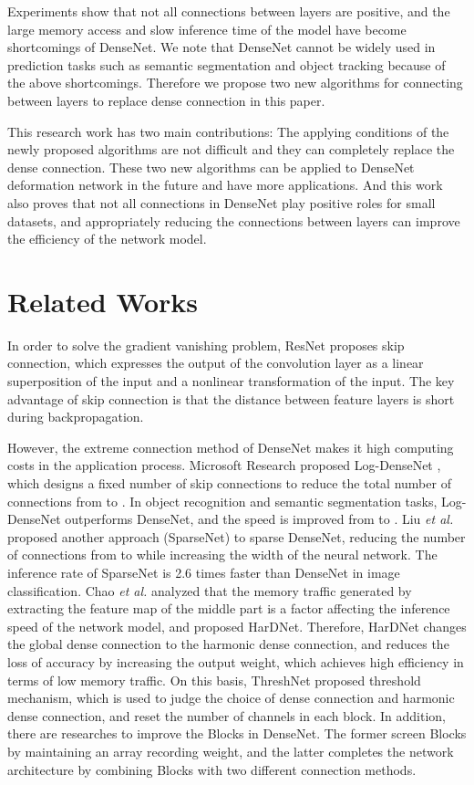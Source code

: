 \documentclass[conference]{IEEEtran}
\begin{document}
Experiments \cite{zhu2018sparsely} show that not all connections between layers are positive, and the large memory access and slow inference time of the model have become shortcomings of DenseNet. We note that DenseNet cannot be widely used in prediction tasks such as semantic segmentation and object tracking because of the above shortcomings. Therefore we propose two new algorithms for connecting between layers to replace dense connection in this paper.

This research work has two main contributions: The applying conditions of the newly proposed algorithms are not difficult and they can completely replace the dense connection. These two new algorithms can be applied to DenseNet deformation network in the future and have more applications. And this work also proves that not all connections in DenseNet play positive roles for small datasets, and appropriately reducing the connections between layers can improve the efficiency of the network model.

\section{Related Works}
In order to solve the gradient vanishing problem, ResNet proposes skip connection, which expresses the output of the convolution layer as a linear superposition of the input and a nonlinear transformation of the input. The key advantage of skip connection is that the distance between feature layers is short during backpropagation. 

However, the extreme connection method of DenseNet makes it high computing costs in the application process. Microsoft Research proposed Log-DenseNet \cite{hu2017log}, which designs a fixed number of skip connections to reduce the total number of connections from  to . In object recognition and semantic segmentation tasks, Log-DenseNet outperforms DenseNet, and the speed is improved from  to . Liu \emph{et al.} \cite{liu2018sparsenet} proposed another approach (SparseNet) to sparse DenseNet, reducing the number of connections from  to  while increasing the width of the neural network. The inference rate of SparseNet is 2.6 times faster than DenseNet in image classification. Chao \emph{et al.} \cite{chao2019hardnet} analyzed that the memory traffic generated by extracting the feature map of the middle part is a factor affecting the inference speed of the network model, and proposed HarDNet. Therefore, HarDNet changes the global dense connection to the harmonic dense connection, and reduces the loss of accuracy by increasing the output weight, which achieves high efficiency in terms of low memory traffic. On this basis, ThreshNet \cite{ju2022threshnet} proposed threshold mechanism, which is used to judge the choice of dense connection and harmonic dense connection, and reset the number of channels in each block. In addition, there are researches \cite{wang2021sparsenet}\cite{ju2021new} to improve the Blocks in DenseNet. The former screen Blocks by maintaining an array recording weight, and the latter completes the network architecture by combining Blocks with two different connection methods.
\end{document}
